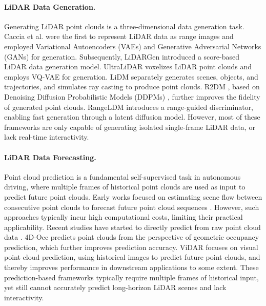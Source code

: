 \vspace{-4mm}

\paragraph{LiDAR Data Generation.}
Generating LiDAR point clouds is a three-dimensional data generation task. 
Caccia et al. \cite{caccia2019deep} were the first to represent LiDAR data as range images and employed Variational Autoencoders (VAEs) \cite{kingma2013auto} and Generative Adversarial Networks (GANs) \cite{ goodfellow2014generative} for generation.
Subsequently, LiDARGen \cite{LiDARGen2022} introduced a score-based LiDAR data generation model. 
UltraLiDAR \cite{xiong2023ultralidar} voxelizes LiDAR point clouds and employs VQ-VAE \cite{yu2021vector} for generation.
LiDM \cite{ran2024towards} separately generates scenes, objects, and trajectories, and simulates ray casting to produce point clouds.
R2DM \cite{nakashima2024lidar}, based on Denoising Diffusion Probabilistic Models (DDPMs) \cite{song2020denoising}, further improves the fidelity of generated point clouds.
RangeLDM \cite{hu2024rangeldm} introduces a range-guided discriminator, enabling fast generation through a latent diffusion model.
However, most of these frameworks are only capable of generating isolated single-frame LiDAR data, or lack real-time interactivity.

\vspace{-3mm}

\paragraph{LiDAR Data Forecasting.}
Point cloud prediction \cite{mersch2022self, weng2021inverting, weng2022s2net, wilson2023argoverse} is a fundamental self-supervised task in autonomous driving, where multiple frames of historical point clouds are used as input to predict future point clouds. 
Early works focused on estimating scene flow between consecutive point clouds to forecast future point cloud sequences \cite{liu2019flownet3d, zhai2021optical}. 
However, such approaches typically incur high computational costs, limiting their practical applicability.
Recent studies have started to directly predict from raw point cloud data \cite{luo2023pcpnet, pal2024atppnet, weng2021inverting, weng2022s2net}. 
4D-Occ \cite{khurana2023point} predicts point clouds from the perspective of geometric occupancy prediction, which further improves prediction accuracy.
ViDAR \cite{yang2024visual} focuses on visual point cloud prediction, using historical images to predict future point clouds, and thereby improves performance in downstream applications to some extent.
These prediction-based frameworks typically require multiple frames of historical input, yet still cannot accurately predict long-horizon LiDAR scenes and lack interactivity.